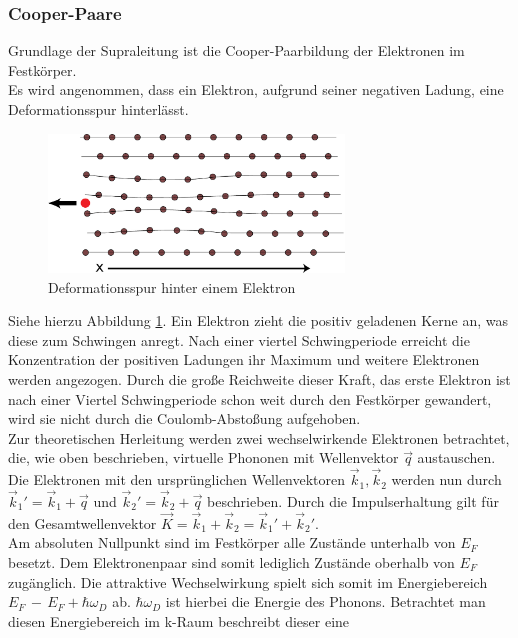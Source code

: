         \subsubsection{Cooper-Paare}
Grundlage der Supraleitung ist die Cooper-Paarbildung der Elektronen im Festkörper.
\\
Es wird angenommen, dass ein Elektron, aufgrund seiner negativen Ladung, eine 
Deformationsspur hinterlässt. 
\begin{figure}[h]
    \centering
    \includegraphics[width=0.7\textwidth]{Abb/deformation.pdf}
    \caption{Deformationsspur hinter einem Elektron \cite{bcswiki}}
    \label{Abb:def}
\end{figure}
Siehe hierzu Abbildung \ref{Abb:def}. Ein Elektron zieht die positiv geladenen Kerne
an, was diese zum Schwingen anregt. Nach einer viertel Schwingperiode erreicht die
Konzentration der positiven Ladungen ihr Maximum und weitere Elektronen werden 
angezogen. Durch die große Reichweite dieser Kraft, das erste Elektron ist nach
einer Viertel Schwingperiode schon weit durch den Festkörper gewandert, wird sie
nicht durch die Coulomb-Abstoßung aufgehoben.
\vspace{3pt}\\
Zur theoretischen Herleitung werden zwei wechselwirkende Elektronen betrachtet, die,
wie oben beschrieben, virtuelle Phononen mit Wellenvektor $\vec{q}$ austauschen.
Die Elektronen mit den ursprünglichen Wellenvektoren $\vec{k}_1, \vec{k}_2$ werden
nun durch $\vec{k}_1' = \vec{k}_1 + \vec{q}$ und $\vec{k}_2 ' = \vec{k}_2 + \vec{q}$
beschrieben. Durch die Impulserhaltung gilt für den Gesamtwellenvektor $\vec{K} =
\vec{k}_1 + \vec{k}_2 = \vec{k}_1' + \vec{k}_2'$.\\
Am absoluten Nullpunkt sind im Festkörper alle Zustände unterhalb von $E_F$
besetzt. Dem Elektronenpaar sind somit lediglich Zustände oberhalb von $E_F$ 
zugänglich. Die attraktive Wechselwirkung spielt sich somit im Energiebereich
$E_F \, - \, E_F + \hbar \omega_D$ ab. $\hbar \omega_D$ ist hierbei die Energie
des Phonons. Betrachtet man diesen Energiebereich im k-Raum beschreibt dieser eine
